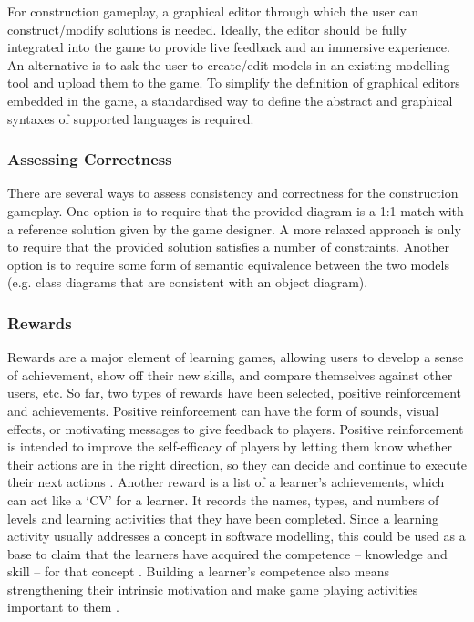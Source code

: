 \documentclass[12pt, a4paper]{report} \usepackage[titletoc]{appendix}
\begin{document}
For construction gameplay, a graphical editor through which the user can construct/modify solutions is needed. Ideally, the editor should be fully integrated into the game to provide live feedback and an immersive experience. An alternative is to ask the user to create/edit models in an existing modelling tool and upload them to the game. To simplify the definition of graphical editors embedded in the game, a standardised way to define the abstract and graphical syntaxes of supported languages is required. 

\subsubsection{Assessing Correctness} 
\label{Assessing Correctness} 
There are several ways to assess consistency and correctness for the construction gameplay. One option is to require that the provided diagram is a 1:1 match with a reference solution given by the game designer. A more relaxed approach is only to require that the provided solution satisfies a number of constraints. Another option is to require some form of semantic equivalence between the two models (e.g. class diagrams that are consistent with an object diagram). 

\subsubsection{Rewards}
\label{Rewards}
Rewards are a major element of learning games, allowing users to develop a sense of achievement, show off their new skills, and compare themselves against other users, etc. So far, two types of rewards have been selected, positive reinforcement and achievements. Positive reinforcement can have the form of sounds, visual effects, or motivating messages to give feedback to players. Positive reinforcement is intended to improve the self-efficacy of players by letting them know whether their actions are in the right direction, so they can decide and continue to execute their next actions \cite{richter2015studying}. Another reward is a list of a learner's achievements, which can act like a `CV' for a learner. It records the names, types, and numbers of levels and learning activities that they have been completed. Since a learning activity usually addresses a concept in software modelling, this could be used as a base to claim that the learners have acquired the competence -- knowledge and skill -- for that concept \cite{richter2015studying}. Building a learner's competence also means strengthening their intrinsic motivation \cite{ryan2017self} and make game playing activities important to them \cite{nicholson2015recipe}.
\end{document}
